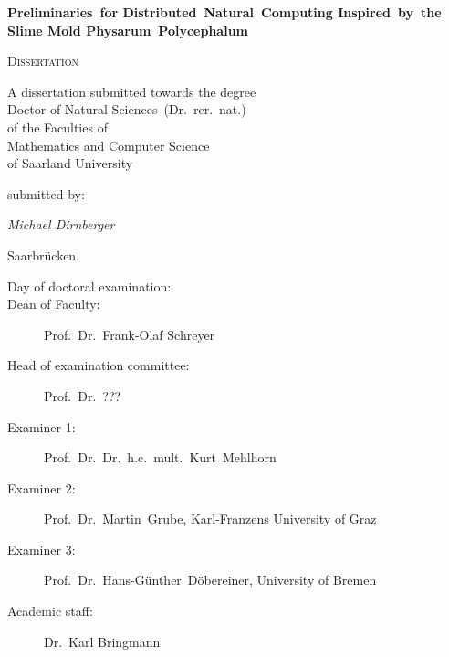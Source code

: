 
\begin{titlepage}
	\centering
	\null\vfill
	
	{\huge\bfseries Preliminaries~for Distributed~Natural~Computing Inspired~by~the Slime Mold Physarum~Polycephalum\par}
	


	\vfill

	{\scshape\Large Dissertation}
	\vfill


	{\large A dissertation submitted towards the degree\\
	Doctor of Natural Sciences~(Dr.~rer.~nat.)\\
	of the Faculties of\\
	Mathematics and Computer Science\\
	of Saarland University}


	\vfill
	submitted by:
	\vfill

	{\Large\itshape Michael Dirnberger}

	\vfill

	{\large Saarbrücken, \thesisdate{}}
	\vfill
\end{titlepage}


\newpage
\thispagestyle{plain}
\null
\vfill
\begin{description}
	\item[Day of doctoral examination:] 
 	\item[Dean of Faculty:] Prof.~Dr.~Frank-Olaf Schreyer
 	\item[Head of examination committee:] Prof.~Dr.~???
	\item[Examiner 1:] Prof.~Dr.~Dr.~h.c.~mult.~Kurt~Mehlhorn
	\item[Examiner 2:] Prof.~Dr.~Martin~Grube, Karl-Franzens University of Graz
	\item[Examiner 3:] Prof.~Dr.~Hans-Günther~Döbereiner, University of Bremen
	\item[Academic staff:] Dr.~Karl Bringmann
\end{description}

\newpage
